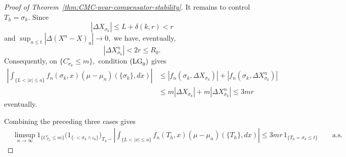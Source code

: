 \documentclass[a4paper,10pt]{article}
\begin{document}
\begin{proof}[Proof of Theorem~\ref{thm:CMC-pvar-compensator-stability}]
It remains to control \(T_h=\sigma_k\). Since
\[
        |\Delta X_{\sigma_k}|
        \le L+\delta(k,r)<r
\]
and
$
        \sup_{u\le t}|\Delta(X^n-X)_u|
        \longrightarrow0,
$
we have, eventually,
\[
        |\Delta X^n_{\sigma_k}|<2r\le R_0.
\]
Consequently, on
$
        \{C^\circ_{\sigma_k}\le m\},
$
condition \({\rm (LG}_0{\rm )}\) gives
\[
\begin{aligned}
\left|
\int_{\{L<|x|\le a\}}
f_n(\sigma_k,x)(\mu-\mu_n)(\{\sigma_k\},dx)
\right|
&\le
|f_n(\sigma_k,\Delta X_{\sigma_k})|
+
|f_n(\sigma_k,\Delta X^n_{\sigma_k})|
\\
&\le
m|\Delta X_{\sigma_k}|
+
m|\Delta X^n_{\sigma_k}|
\le 3mr
\end{aligned}
\]
eventually.

Combining the preceding three cases gives
\begin{align}
&\limsup_{n\to\infty}
1_{\{C^\circ_{T_h}\le m\}}
\bigl(1_{\{\cdot<\sigma_k\wedge\iota_a\}}\bigr)_{T_h-}
\left|
\int_{\{L<|x|\le a\}}
f_n(T_h,x)(\mu-\mu_n)(\{T_h\},dx)
\right|
\le
3mr\,1_{\{T_h=\sigma_k\le t\}}
\qquad\text{a.s.}
\label{eq:pvar-pathwise-boundary}
\end{align}


\end{proof}
\end{document}
